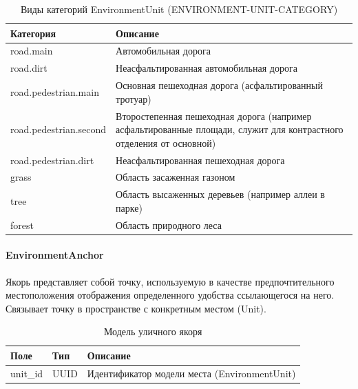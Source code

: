         \begin{center}
          \begin{xltabular}{\linewidth}{|l|X|}
            \caption{Виды категорий EnvironmentUnit (ENVIRONMENT-UNIT-CATEGORY)}\\ \hline
            Категория              & Описание                                                                                                            \\ \hline
            road.main              & Автомобильная дорога                                                                                                \\ \hline
            road.dirt              & Неасфальтированная автомобильная дорога                                                                             \\ \hline
            road.pedestrian.main   & Основная пешеходная дорога (асфальтированный тротуар)                                                               \\ \hline
            road.pedestrian.second & Второстепенная пешеходная дорога (например асфальтированные площади, служит для контрастного отделения от основной) \\ \hline
            road.pedestrian.dirt   & Неасфальтированная  пешеходная дорога                                                                               \\ \hline
            grass                  & Область засаженная газоном                                                                                          \\ \hline
            tree                   & Область высаженных деревьев (например аллеи в парке)                                                                \\ \hline
            forest                 & Область природного леса                                                                                             \\ \hline
          \end{xltabular}
        \end{center}

      \paragraph{EnvironmentAnchor}

        Якорь представляет собой точку, используемую в качестве предпочтительного местоположения отображения определенного удобства ссылающегося на него. Связывает точку в пространстве с конкретным местом (Unit).
        \begin{center}
          \begin{xltabular}{\linewidth}{|l|p{4cm}|X|}
            \caption{Модель уличного якоря}\\\hline
            Поле     & Тип   & Описание                                     \\ \hline
            unit\_id & UUID  & Идентификатор модели места (EnvironmentUnit) \\ \hline
          \end{xltabular}
        \end{center}

